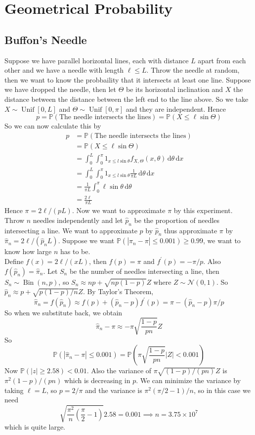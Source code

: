 \section{Geometrical Probability}
\subsection{Buffon's Needle}
Suppose we have parallel horizontal lines, each with distance $L$ apart from each other and we have a needle with length $\ell\le L$.
Throw the needle at random, then we want to know the probbaility that it intersects at least one line.
Suppose we have dropped the needle, then let $\Theta$ be its horizontal inclination and $X$ the distance between the distance between the left end to the line above.
So we take $X\sim\operatorname{Unif}[0,L]$ and $\Theta\sim\operatorname{Unif}[0,\pi]$ and they are independent.
Hence
$$p=\mathbb P(\text{The needle intersects the lines})=\mathbb P(X\le\ell\sin\Theta)$$
So we can now calculate this by
\begin{align*}
    p&=\mathbb P(\text{The needle intersects the lines})\\
    &=\mathbb P(X\le\ell\sin\Theta)\\
    &=\int_0^L\int_0^\pi 1_{x\le l\sin\theta}f_{X,\Theta}(x,\theta)\,\mathrm d\theta\,\mathrm dx\\
    &=\int_0^L\int_0^\pi  1_{x\le l\sin\theta}\frac{1}{\pi L}\,\mathrm d\theta\,\mathrm dx\\
    &=\frac{1}{\pi L}\int_0^\pi\ell\sin\theta\,\mathrm d\theta\\
    &=\frac{2\ell}{\pi L}
\end{align*}
Hence $\pi=2\ell/(pL)$.
Now we want to approximate $\pi$ by this experiment.
Throw $n$ needles independently and let $\hat{p}_n$ be the proportion of needles intersecting a line.
We want to approximate $p$ by $\hat{p}_n$ thus approximate $\pi$ by $\hat\pi_n=2\ell/(\hat{p}_nL)$.
Suppose we want $\mathbb P(|\hat\pi_n-\pi|\le 0.001)\ge 0.99$, we want to know how large $n$ has to be.\\
Define $f(x)=2\ell/(xL)$, then $f(p)=\pi$ and $f^\prime(p)=-\pi/p$.
Also $f(\hat{p}_n)=\hat\pi_n$.
Let $S_n$ be the number of needles intersecting a line, then $S_n\sim\operatorname{Bin}(n,p)$, so $S_n\approx np+\sqrt{np(1-p)}Z$ where $Z\sim\mathcal N(0,1)$.
So $\hat{p}_n\approx p+\sqrt{p(1-p)/n}Z$.
By Taylor's Theorem,
$$\hat\pi_n=f(\hat{p}_n)\approx f(p)+(\hat{p}_n-p)f^\prime(p)=\pi-(\hat{p}_n-p)\pi/p$$
So when we substitute back, we obtain
$$\hat\pi_n-\pi\approx-\pi\sqrt{\frac{1-p}{pn}}Z$$
So
$$\mathbb P(|\hat\pi_n-\pi|\le 0.001)=\mathbb P\left( \pi\sqrt{\frac{1-p}{pn}}|Z|<0.001 \right)$$
Now $\mathbb P(|z|\ge 2.58)<0.01$.
Also the variance of $\pi\sqrt{(1-p)/(pn)}Z$ is $\pi^2(1-p)/(pn)$ which is decreasing in $p$.
We can minimize the variance by taking $\ell=L$, so $p=2/\pi$ and the variance is $\pi^2(\pi/2-1)/n$, so in this case we need
$$\sqrt{\frac{\pi^2}{n}(\frac{\pi}{2}-1)}2.58=0.001\implies n=3.75\times 10^7$$
which is quite large.
